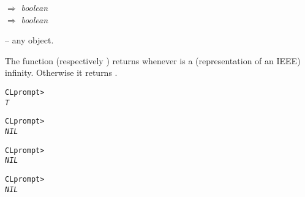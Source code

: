 \documentclass[../Float-Infinities-Nan.tex]{subfiles}
\begin{document}

\DSyntax{}

  $\Rightarrow$ \textit{boolean}\\
  $\Rightarrow$ \textit{boolean}

\DArgsNValues{}

 -- any \CL{} object.

\DDescription{}

The function  (respectively ) returns 
whenever  is a (representation of an IEEE) infinity.  Otherwise
it returns .


\DExamples{}

\begin{alltt}
CL prompt> 
\textit{T}
\end{alltt}

\begin{alltt}
CL prompt> 
\textit{NIL}
\end{alltt}

\begin{alltt}
CL prompt> 
\textit{NIL}
\end{alltt}

\begin{alltt}
CL prompt> 
\textit{NIL}
\end{alltt}
\end{document}
